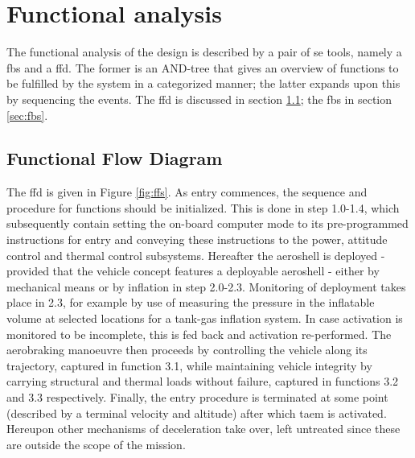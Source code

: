 \section{Functional analysis}\label{ch:func}
The functional analysis of the design is described by a pair of \gls{se} tools, namely a \gls{fbs} and a \gls{ffd}. The former is an AND-tree that gives an overview of functions to be fulfilled by the system in a categorized manner; the latter expands upon this by sequencing the events. The \gls{ffd} is discussed in section \ref{sec:ffd}; the \gls{fbs} in section \ref{sec:fbs}.

\subsection{Functional Flow Diagram} \label{sec:ffd}
The \gls{ffd} is given in Figure \ref{fig:ffs}. As entry commences, the sequence and procedure for functions should be initialized. This is done in step 1.0-1.4, which subsequently contain setting the on-board computer mode to its pre-programmed instructions for entry and conveying these instructions to the power, attitude control and thermal control subsystems. Hereafter the aeroshell is deployed - provided that the vehicle concept features a deployable aeroshell - either by mechanical means or by inflation in step 2.0-2.3. Monitoring of deployment takes place in 2.3, for example by use of measuring the pressure in the inflatable volume at selected locations for a tank-gas inflation system. In case activation is monitored to be incomplete, this is fed back and activation re-performed. The aerobraking manoeuvre then proceeds by controlling the vehicle along its trajectory, captured in function 3.1, while maintaining vehicle integrity by carrying structural and thermal loads without failure, captured in functions 3.2 and 3.3 respectively. Finally, the entry procedure is terminated at some point (described by a terminal velocity and altitude) after which \gls{taem} is activated. Hereupon other mechanisms of deceleration take over, left untreated since these are outside the scope of the mission.

